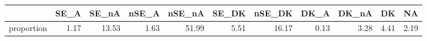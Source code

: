 \begin{table}[ht]
\centering
\begin{tabular}{rrrrrrrrrrr}
  \hline
 & SE\_A & SE\_nA & nSE\_A & nSE\_nA & SE\_DK & nSE\_DK & DK\_A & DK\_nA & DK & NA \\ 
  \hline
proportion & 1.17 & 13.53 & 1.63 & 51.99 & 5.51 & 16.17 & 0.13 & 3.28 & 4.41 & 2.19 \\ 
   \hline
\end{tabular}
\end{table}
